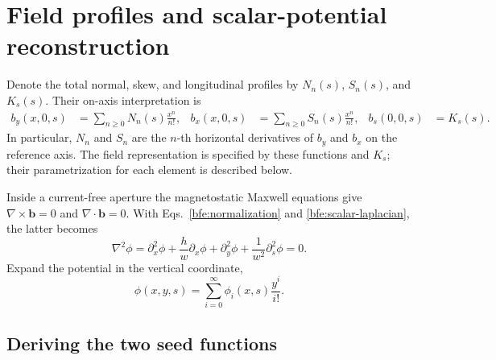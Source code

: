 \section{Field profiles and scalar-potential reconstruction}
\label{sec:magnetic-field-reconstruction}

Denote the total normal, skew, and longitudinal profiles by
\(N_n(s)\), \(S_n(s)\), and \(K_s(s)\). Their on-axis interpretation is
\begin{align}
 b_y(x,0,s)&=\sum_{n\geq0}N_n(s)\frac{x^n}{n!}, &
 b_x(x,0,s)&=\sum_{n\geq0}S_n(s)\frac{x^n}{n!}, &
 b_s(0,0,s)&=K_s(s).
 \label{bfe:profiles}
\end{align}
In particular, \(N_n\) and \(S_n\) are the \(n\)-th horizontal
derivatives of \(b_y\) and \(b_x\) on the reference axis. The field
representation is specified by these functions and \(K_s\); their
parametrization for each element is described below.

Inside a current-free aperture the magnetostatic Maxwell equations give
\(\nabla\times\bm b=0\) and \(\nabla\cdot\bm b=0\). With
Eqs.~\eqref{bfe:normalization} and \eqref{bfe:scalar-laplacian}, the latter becomes
\begin{equation}
 \nabla^2\phi=
 \partial_x^2\phi+\frac{h}{w}\partial_x\phi
 +\partial_y^2\phi+\frac{1}{w^2}\partial_s^2\phi=0.
 \label{bfe:laplace}
\end{equation}
Expand the potential in the vertical coordinate,
\begin{equation}
 \phi(x,y,s)=\sum_{i=0}^{\infty}\phi_i(x,s)\frac{y^i}{i!}.
 \label{bfe:series}
\end{equation}
\subsection{Deriving the two seed functions}

